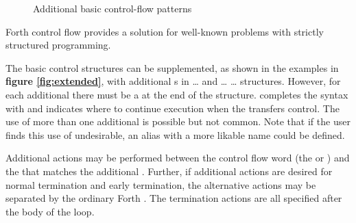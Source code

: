 \begin{figure}[ht]
  \begin{center}
	\caption{Additional basic control-flow patterns}
	\label{fig:additional}
  \end{center}
\end{figure}

Forth control flow provides a solution for well-known problems with
strictly structured programming.

The basic control structures can be supplemented, as shown in the
examples in \textbf{figure \ref{fig:extended}}, with additional
s in  {\ldots}  and 
{\ldots}  {\ldots}  structures. However, for
each additional  there must be a  at the end
of the structure.  completes the syntax with 
and indicates where to continue execution when the 
transfers control. The use of more than one additional 
is possible but not common. Note that if the user finds this use of
 undesirable, an alias with a more likable name could be
defined.

Additional actions may be performed between the control flow word (the
 or ) and the  that matches the
additional . Further, if additional actions are desired
for normal termination and early termination, the alternative actions
may be separated by the ordinary Forth . The termination
actions are all specified after the body of the loop.

